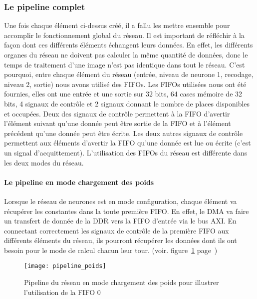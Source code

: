 \subsubsection{Le pipeline complet}
Une fois chaque élément ci-dessus créé, il a fallu les mettre ensemble pour accomplir 
le fonctionnement global du réseau. Il est important de réfléchir à la façon dont ces différents éléments 
échangent leurs données. En effet, les différents organes du réseau ne doivent pas calculer la même 
quantité de données, donc le temps de traitement d'une image n'est pas identique dans tout le réseau. 
C'est pourquoi, entre chaque élément du réseau (entrée, niveau de neurone 1, recodage, niveau 2, sortie) 
nous avons utilisé des FIFOs. Les FIFOs utilisées nous ont été fournies, elles ont une entrée et une sortie sur 32 bits, 
64 cases mémoire de 32 bits, 4 signaux de contrôle et 2 signaux donnant le nombre de places disponibles et occupées. 
Deux des signaux de contrôle permettent à la FIFO d'avertir l'élément suivant qu'une donnée peut être sortie de la FIFO 
et à l'élément précédent  qu'une donnée peut être écrite. Les deux autres signaux de contrôle permettent aux éléments
d'avertir la FIFO qu'une donnée est lue ou écrite (c'est un signal d'acquittement). 
L'utilisation des FIFOs du réseau est différente dans les deux modes du réseau.
	\paragraph{Le pipeline en mode chargement des poids}
	Lorsque le réseau de neurones est en mode configuration, chaque élément va récupérer les constantes dans la 
	toute première FIFO. En effet, le DMA va faire un transfert de donnée de la DDR vers la FIFO d'entrée via le bus AXI. 
	En connectant correctement les signaux de contrôle de la première FIFO aux différents éléments du réseau, 
	ils pourront récupérer les données dont ils ont besoin pour le mode de calcul chacun leur tour. 
	(voir. figure~\ref{fig:pipeline_poids} page~\pageref{fig:pipeline_poids})
	
	\begin{figure}[h!]
		\texttt{[image: pipeline\_poids]}
		\caption{Pipeline du réseau en mode chargement des poids pour illustrer l'utilisation de la FIFO 0}
		\label{fig:pipeline_poids}
	\end{figure}
	
